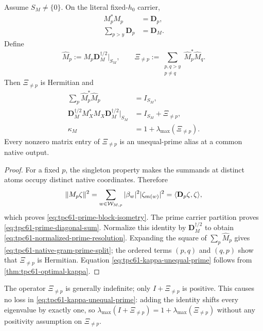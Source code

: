 \begin{theorem}
\label{thm:tpc61-prime-block-identity}
Assume \(S_M\ne\{0\}\).  On the literal fixed-\(h_0\) carrier,
\begin{align}
 M_p^*M_p&=\mathbf D_p,
 \label{eq:tpc61-prime-block-isometry}\\
 \sum_{p>y}\mathbf D_p&=\mathbf D_M.
 \label{eq:tpc61-prime-diagonal-sum}
\end{align}
Define
\begin{equation}
 \widehat M_p
 :=M_p\mathbf D_M^{\dagger/2}|_{S_M},
 \qquad
 \Xi_{\ne p}
 :=\sum_{\substack{p,q>y\\p\ne q}}
     \widehat M_p^*\widehat M_q.
 \label{eq:tpc61-unequal-prime-operator}
\end{equation}
Then \(\Xi_{\ne p}\) is Hermitian and
\begin{align}
 \sum_p\widehat M_p^*\widehat M_p&=I_{S_M},
 \label{eq:tpc61-normalized-prime-resolution}\\
 \mathbf D_M^{\dagger/2}M_X^*M_X
 \mathbf D_M^{\dagger/2}\big|_{S_M}
 &=I_{S_M}+\Xi_{\ne p},
 \label{eq:tpc61-native-gram-prime-split}\\
 \kappa_M&=\boxed{1+\lambda_{\max}(\Xi_{\ne p})}.
 \label{eq:tpc61-kappa-unequal-prime}
\end{align}
Every nonzero matrix entry of \(\Xi_{\ne p}\) is an unequal-prime alias
at a common native output.
\end{theorem}

\begin{proof}
For a fixed \(p\), the singleton property makes the summands at distinct
atoms occupy distinct native coordinates.  Therefore
\[
 \|M_p\zeta\|^2
 =\sum_{w\in\mathcal W_{M,p}}
   |\beta_w|^2|\zeta_{m(w)}|^2
 =\langle\mathbf D_p\zeta,\zeta\rangle,
\]
which proves \eqref{eq:tpc61-prime-block-isometry}.  The prime carrier
partition proves \eqref{eq:tpc61-prime-diagonal-sum}.  Normalize this
identity by \(\mathbf D_M^{\dagger/2}\) to obtain
\eqref{eq:tpc61-normalized-prime-resolution}.  Expanding the square of
\(\sum_p\widehat M_p\) gives
\eqref{eq:tpc61-native-gram-prime-split}; the ordered terms
\((p,q)\) and \((q,p)\) show that \(\Xi_{\ne p}\) is Hermitian.
Equation \eqref{eq:tpc61-kappa-unequal-prime} follows from
\cref{thm:tpc61-optimal-kappa}.
\end{proof}

The operator \(\Xi_{\ne p}\) is generally indefinite; only
\(I+\Xi_{\ne p}\) is positive.  This causes no loss in
\eqref{eq:tpc61-kappa-unequal-prime}: adding the identity shifts every
eigenvalue by exactly one, so
\(\lambda_{\max}(I+\Xi_{\ne p})
=1+\lambda_{\max}(\Xi_{\ne p})\) without any positivity assumption on
\(\Xi_{\ne p}\).

